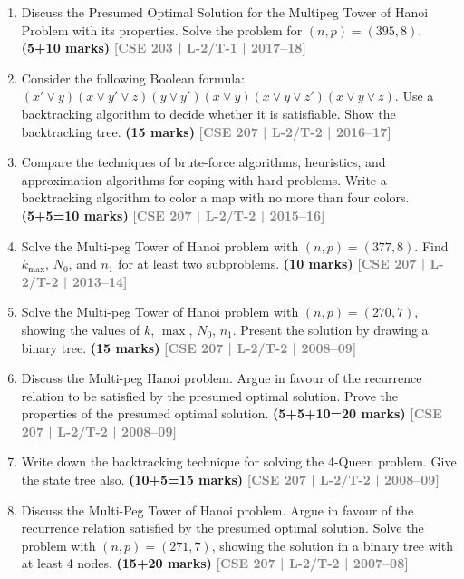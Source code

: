 \documentclass[12pt,a3paper]{article}
\newcommand{\yr}[1]{\hfill\textcolor{gray}{\small\textbf{[#1]}}}
\newcommand{\mk}[1]{\textcolor{orange!70!black}{\small\textbf{(#1 marks)}}}
\begin{document}
\begin{enumerate}
\begin{center}
\end{center}


\item Discuss the Presumed Optimal Solution for the Multipeg Tower of Hanoi Problem with its properties. Solve the problem for $(n, p) = (395, 8)$. \mk{5+10}
\yr{CSE 203 | L-2/T-1 | 2017--18}

\item Consider the following Boolean formula: $(x' \vee y)(x \vee y' \vee z)(y \vee y')(x \vee y)(x \vee y \vee z')(x \vee y \vee z)$. Use a backtracking algorithm to decide whether it is satisfiable. Show the backtracking tree. \mk{15}
\yr{CSE 207 | L-2/T-2 | 2016--17}


\item Compare the techniques of brute-force algorithms, heuristics, and approximation algorithms for coping with hard problems. Write a backtracking algorithm to color a map with no more than four colors. \mk{5+5=10}
\yr{CSE 207 | L-2/T-2 | 2015--16}

\item Solve the Multi-peg Tower of Hanoi problem with $(n, p) = (377, 8)$. Find $k_{\max}$, $N_0$, and $n_1$ for at least two subproblems. \mk{10}
\yr{CSE 207 | L-2/T-2 | 2013--14}

\item Solve the Multi-peg Tower of Hanoi problem with $(n, p) = (270, 7)$, showing the values of $k$, $\max$, $N_0$, $n_1$. Present the solution by drawing a binary tree. \mk{15}
\yr{CSE 207 | L-2/T-2 | 2008--09}


\item Discuss the Multi-peg Hanoi problem. Argue in favour of the recurrence relation to be satisfied by the presumed optimal solution. Prove the properties of the presumed optimal solution. \mk{5+5+10=20}
\yr{CSE 207 | L-2/T-2 | 2008--09}

\item Write down the backtracking technique for solving the 4-Queen problem. Give the state tree also. \mk{10+5=15}
\yr{CSE 207 | L-2/T-2 | 2008--09}

\item Discuss the Multi-Peg Tower of Hanoi problem. Argue in favour of the recurrence relation satisfied by the presumed optimal solution. Solve the problem with $(n, p) = (271, 7)$, showing the solution in a binary tree with at least 4 nodes. \mk{15+20}
\yr{CSE 207 | L-2/T-2 | 2007--08}



\end{enumerate}
\end{document}
